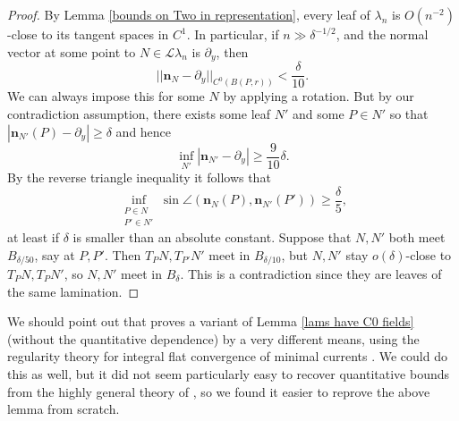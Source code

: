 \documentclass[reqno,11pt]{amsart}
\newcommand{\Leaves}{\mathscr L}
\newcommand{\normal}{\mathbf n}
\theoremstyle{definition}
\numberwithin{equation}{section}
\begin{document}
\begin{proof}
	By Lemma \ref{bounds on Two in representation}, every leaf of $\lambda_n$ is $O(n^{-2})$-close to its tangent spaces in $C^1$.
	In particular, if $n \gg \delta^{-1/2}$, and the normal vector at some point to $N \in \Leaves \lambda_n$ is $\partial_y$, then
	$$||\normal_N - \partial_y||_{C^0(B(P, r))} < \frac{\delta}{10}.$$
	We can always impose this for some $N$ by applying a rotation.
	But by our contradiction assumption, there exists some leaf $N'$ and some $P \in N'$ so that $|\normal_{N'}(P) - \partial_y| \geq \delta$ and hence
	$$\inf_{N'} |\normal_{N'} - \partial_y| \geq \frac{9}{10}\delta.$$
	By the reverse triangle inequality it follows that 
	$$\inf_{\substack{P \in N\\ P' \in N'}} \sin \angle(\normal_N(P), \normal_{N'}(P')) \geq \frac{\delta}{5},$$
	at least if $\delta$ is smaller than an absolute constant.
	Suppose that $N, N'$ both meet $B_{\delta/50}$, say at $P, P'$. Then $T_PN, T_{P'} N'$ meet in $B_{\delta/10}$, but $N, N'$ stay $o(\delta)$-close to $T_PN, T_PN'$, so $N, N'$ meet in $B_\delta$. This is a contradiction since they are leaves of the same lamination.
\end{proof}

We should point out that \cite{Solomon86} proves a variant of Lemma \ref{lams have C0 fields} (without the quantitative dependence) by a very different means, using the regularity theory for integral flat convergence of minimal currents \cite[Theorem 5.3.14]{federer2014geometric}.
We could do this as well, but it did not seem particularly easy to recover quantitative bounds from the highly general theory of \cite[Chapter 5]{federer2014geometric}, so we found it easier to reprove the above lemma from scratch.
\end{document}
